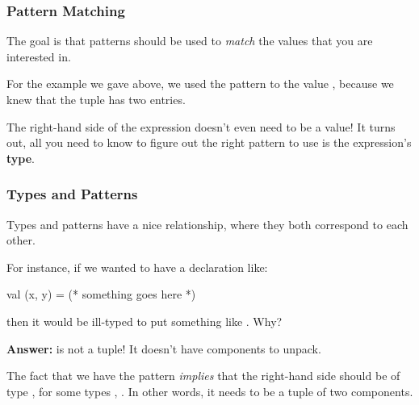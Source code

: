 \documentclass[aspectratio=169]{beamer}
\begin{document}
\begin{frame}[fragile]
  \frametitle{Pattern Matching}


  \pause
  \vspace{5pt}

  The goal is that patterns should be used to \textit{match} the values that you are interested
  in.

  \pause
  \vspace{\fill}

  For the example we gave above, we used the pattern  to 
  the value , because we knew that the tuple  has two entries.

  \pause
  \vspace{\fill}

  The right-hand side of the expression doesn't even need to be a value! It turns out,
  all you need to know to figure out the right pattern to use is the expression's
  \textbf{type}.
\end{frame}

\begin{frame}[fragile]
  \frametitle{Types and Patterns}

  \tgs

  Types and patterns have a nice relationship, where they both correspond to each other.

  \pause
  \vspace{\fill}

  For instance, if we wanted to have a declaration like:
  \begin{codeblock}
    val (x, y) = (* something goes here *)
  \end{codeblock}

  then it would be ill-typed to put something like . Why?

  \pause
  \vspace{\fill}

  \textbf{Answer:}  is not a tuple! It doesn't have components to unpack.

  \pause
  \vspace{\fill}

  The fact that we have the pattern  \textit{implies} that the right-hand side
  should be of type , for some types , . In other words,
  it needs to be a tuple of two components.
\end{frame}
\end{document}
